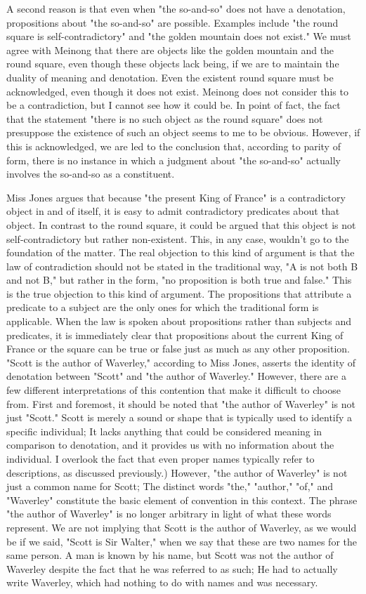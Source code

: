 \documentclass[a4paper,12pt]{book}[2004/02/16]
\theoremstyle{ilemma}
\theoremstyle{itheorem}
\theoremstyle{iother}
\theoremstyle{icorollary}
\theoremstyle{numcorollary}
\theoremstyle{idefinition}
\begin{document}
A second reason is that even when "the so-and-so" does not have a denotation, propositions about "the so-and-so" are possible. Examples include "the round square is self-contradictory" and "the golden mountain does not exist." We must agree with Meinong that there are objects like the golden mountain and the round square, even though these objects lack being, if we are to maintain the duality of meaning and denotation. Even the existent round square must be acknowledged, even though it does not exist. Meinong does not consider this to be a contradiction, but I cannot see how it could be. In point of fact, the fact that the statement "there is no such object as the round square" does not presuppose the existence of such an object seems to me to be obvious. However, if this is acknowledged, we are led to the conclusion that, according to parity of form, there is no instance in which a judgment about "the so-and-so" actually involves the so-and-so as a constituent.

Miss Jones argues that because "the present King of France" is a contradictory object in and of itself, it is easy to admit contradictory predicates about that object. In contrast to the round square, it could be argued that this object is not self-contradictory but rather non-existent. This, in any case, wouldn't go to the foundation of the matter.
The real objection to this kind of argument is that the law of contradiction should not be stated in the traditional way, "A is not both B and not B," but rather in the form, "no proposition is both true and false." This is the true objection to this kind of argument. The propositions that attribute a predicate to a subject are the only ones for which the traditional form is applicable. When the law is spoken about propositions rather than subjects and predicates, it is immediately clear that propositions about the current King of France or the square can be true or false just as much as any other proposition. "Scott is the author of Waverley," according to Miss Jones, asserts the identity of denotation between "Scott" and "the author of Waverley." However, there are a few different interpretations of this contention that make it difficult to choose from. First and foremost, it should be noted that "the author of Waverley" is not just "Scott." Scott is merely a sound or shape that is typically used to identify a specific individual; It lacks anything that could be considered meaning in comparison to denotation, and it provides us with no information about the individual. I overlook the fact that even proper names typically refer to descriptions, as discussed previously.) However, "the author of Waverley" is not just a common name for Scott; The distinct words "the," "author," "of," and "Waverley" constitute the basic element of convention in this context. The phrase "the author of Waverley" is no longer arbitrary in light of what these words represent. We are not implying that Scott is the author of Waverley, as we would be if we said, "Scott is Sir Walter," when we say that these are two names for the same person.
A man is known by his name, but Scott was not the author of Waverley despite the fact that he was referred to as such; He had to actually write Waverley, which had nothing to do with names and was necessary.
\end{document}

